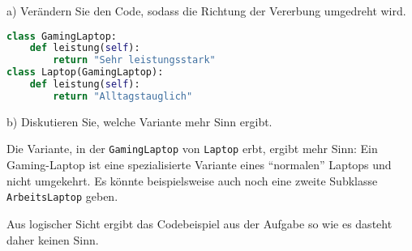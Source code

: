 \documentclass[11pt, a4paper, oneside]{article}
\begin{document}
	
	
	
	
	
	\pagebreak
	

	a) Verändern Sie den Code, sodass die Richtung der Vererbung umgedreht wird.
	
	\begin{lstlisting}[language=python]
class GamingLaptop:
	def leistung(self):
		return "Sehr leistungsstark"
class Laptop(GamingLaptop):
	def leistung(self):
		return "Alltagstauglich"
	\end{lstlisting}
	
	b) Diskutieren Sie, welche Variante mehr Sinn ergibt.
	
	Die Variante, in der \texttt{GamingLaptop} von \texttt{Laptop} erbt, ergibt mehr Sinn:
	Ein Gaming-Laptop ist eine spezialisierte Variante eines ``normalen'' Laptops und nicht umgekehrt.
	Es könnte beispielsweise auch noch eine zweite Subklasse \texttt{ArbeitsLaptop} geben.
	
	Aus logischer Sicht ergibt das Codebeispiel aus der Aufgabe so wie es dasteht daher keinen Sinn.
	
\end{document}
